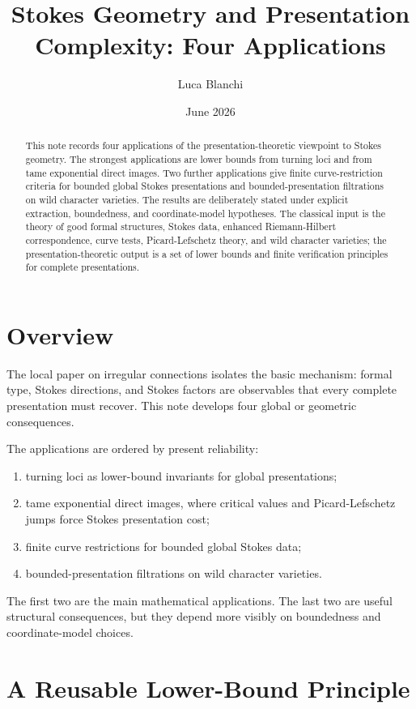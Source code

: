 \documentclass[11pt]{article}
\title{Stokes Geometry and Presentation Complexity: Four Applications}
\author{Luca Blanchi}
\date{June 2026}
\begin{document}
\maketitle

\begin{abstract}
This note records four applications of the presentation-theoretic viewpoint to Stokes geometry.  The strongest applications are lower bounds from turning loci and from tame exponential direct images.  Two further applications give finite curve-restriction criteria for bounded global Stokes presentations and bounded-presentation filtrations on wild character varieties.  The results are deliberately stated under explicit extraction, boundedness, and coordinate-model hypotheses.  The classical input is the theory of good formal structures, Stokes data, enhanced Riemann-Hilbert correspondence, curve tests, Picard-Lefschetz theory, and wild character varieties; the presentation-theoretic output is a set of lower bounds and finite verification principles for complete presentations.
\end{abstract}

\section{Overview}

The local paper on irregular connections isolates the basic mechanism: formal type, Stokes directions, and Stokes factors are observables that every complete presentation must recover.  This note develops four global or geometric consequences.

The applications are ordered by present reliability:
\begin{enumerate}[leftmargin=2em]
\item turning loci as lower-bound invariants for global presentations;
\item tame exponential direct images, where critical values and Picard-Lefschetz jumps force Stokes presentation cost;
\item finite curve restrictions for bounded global Stokes data;
\item bounded-presentation filtrations on wild character varieties.
\end{enumerate}

The first two are the main mathematical applications.  The last two are useful structural consequences, but they depend more visibly on boundedness and coordinate-model choices.

\section{A Reusable Lower-Bound Principle}
\end{document}
